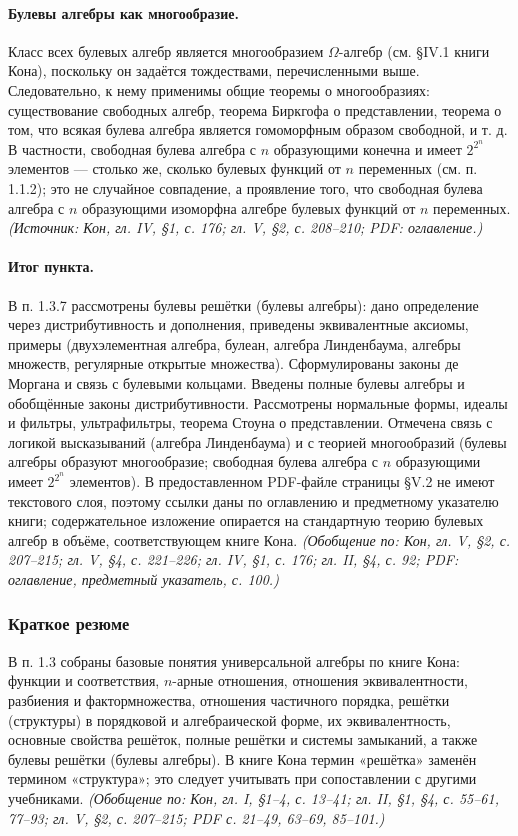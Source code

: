 \documentclass[a4paper,12pt]{article}
\begin{document}
\paragraph{Булевы алгебры как многообразие.}
Класс всех булевых алгебр является многообразием \(\Omega\)-алгебр (см. §IV.1 книги Кона), поскольку он задаётся тождествами, перечисленными выше. Следовательно, к нему применимы общие теоремы о многообразиях: существование свободных алгебр, теорема Биркгофа о представлении, теорема о том, что всякая булева алгебра является гомоморфным образом свободной, и т. д. В частности, свободная булева алгебра с \(n\) образующими конечна и имеет \(2^{2^n}\) элементов — столько же, сколько булевых функций от \(n\) переменных (см. п. 1.1.2); это не случайное совпадение, а проявление того, что свободная булева алгебра с \(n\) образующими изоморфна алгебре булевых функций от \(n\) переменных.
\textit{(Источник: Кон, гл. IV, §1, с. 176; гл. V, §2, с. 208--210; PDF: оглавление.)}

\paragraph{Итог пункта.}
В п. 1.3.7 рассмотрены булевы решётки (булевы алгебры): дано определение через дистрибутивность и дополнения, приведены эквивалентные аксиомы, примеры (двухэлементная алгебра, булеан, алгебра Линденбаума, алгебры множеств, регулярные открытые множества). Сформулированы законы де Моргана и связь с булевыми кольцами. Введены полные булевы алгебры и обобщённые законы дистрибутивности. Рассмотрены нормальные формы, идеалы и фильтры, ультрафильтры, теорема Стоуна о представлении. Отмечена связь с логикой высказываний (алгебра Линденбаума) и с теорией многообразий (булевы алгебры образуют многообразие; свободная булева алгебра с \(n\) образующими имеет \(2^{2^n}\) элементов). В предоставленном PDF-файле страницы §V.2 не имеют текстового слоя, поэтому ссылки даны по оглавлению и предметному указателю книги; содержательное изложение опирается на стандартную теорию булевых алгебр в объёме, соответствующем книге Кона.
\textit{(Обобщение по: Кон, гл. V, §2, с. 207--215; гл. V, §4, с. 221--226; гл. IV, §1, с. 176; гл. II, §4, с. 92; PDF: оглавление, предметный указатель, с. 100.)}

\subsubsection{Краткое резюме}

В п. 1.3 собраны базовые понятия универсальной алгебры по книге Кона: функции и соответствия, \(n\)-арные отношения, отношения эквивалентности, разбиения и фактормножества, отношения частичного порядка, решётки (структуры) в порядковой и алгебраической форме, их эквивалентность, основные свойства решёток, полные решётки и системы замыканий, а также булевы решётки (булевы алгебры). В книге Кона термин «решётка» заменён термином «структура»; это следует учитывать при сопоставлении с другими учебниками.  
\textit{(Обобщение по: Кон, гл. I, §1--4, с. 13--41; гл. II, §1, §4, с. 55--61, 77--93; гл. V, §2, с. 207--215; PDF с. 21--49, 63--69, 85--101.)}
\end{document}
